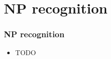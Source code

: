 \section{NP recognition}
\label{sec:np-recognition}

\begin{frame}
  \frametitle{NP recognition}

  \begin{itemize}
  \item TODO
  \end{itemize}
\end{frame}
